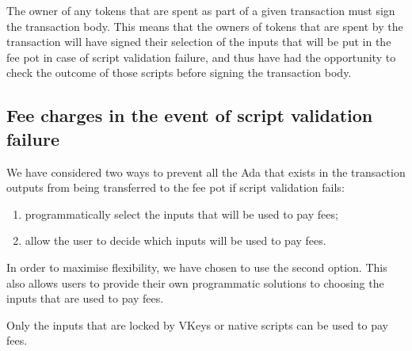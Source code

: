 The owner of any tokens that are spent as part of a given transaction
must sign the transaction body. This means that
the owners of tokens that are spent by the transaction will have
signed their selection of the inputs that will be put in the fee pot in case of script validation failure, and
thus have had the opportunity to check the outcome of those scripts before signing the transaction body.

\subsection{Fee charges in the event of script validation failure}

We have considered two ways to prevent all the Ada that exists in the transaction outputs from being transferred to
the fee pot if script validation fails:
%
\begin{enumerate}
  \item programmatically select the inputs that will be used to pay fees;
  \item allow the user to decide which inputs will be used to pay fees.
\end{enumerate}
%
In order to maximise flexibility, we have chosen to use the second option.
This also allows users to provide their own programmatic solutions to choosing the inputs that are used to pay fees.

Only the inputs that are locked by VKeys or native scripts can
be used to pay fees.
